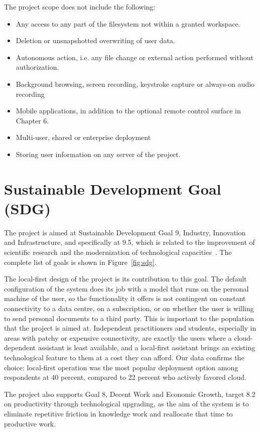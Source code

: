 \documentclass{FastFyp}
\begin{document}
The project scope does not include the following:

\begin{itemize}
    \item Any access to any part of the filesystem not within a granted workspace.
    \item Deletion or unsnapshotted overwriting of user data.
    \item Autonomous action, i.e. any file change or external action performed without authorization.
    \item Background browsing, screen recording, keystroke capture or always-on audio recording
    \item Mobile applications, in addition to the optional remote control surface in Chapter 6.
    \item Multi-user, shared or enterprise deployment
    \item Storing user information on any server of the project.
\end{itemize}

\section{Sustainable Development Goal (SDG)}
The project is aimed at Sustainable Development Goal 9, Industry, Innovation and Infrastructure, and specifically at 9.5, which is related to the improvement of scientific research and the modernization of technological capacities~\cite{ref:sdg}. The complete list of goals is shown in Figure~\ref{fig:sdg}.

The local-first design of the project is its contribution to this goal. The default configuration of the system does its job with a model that runs on the personal machine of the user, so the functionality it offers is not contingent on constant connectivity to a data centre, on a subscription, or on whether the user is willing to send personal documents to a third party. This is important to the population that the project is aimed at. Independent practitioners and students, especially in areas with patchy or expensive connectivity, are exactly the users where a cloud-dependent assistant is least available, and a local-first assistant brings an existing technological feature to them at a cost they can afford. Our data confirms the choice: local-first operation was the most popular deployment option among respondents at 40 percent, compared to 22 percent who actively favored cloud.

The project also supports Goal 8, Decent Work and Economic Growth, target 8.2 on productivity through technological upgrading, as the aim of the system is to eliminate repetitive friction in knowledge work and reallocate that time to productive work.
\end{document}
